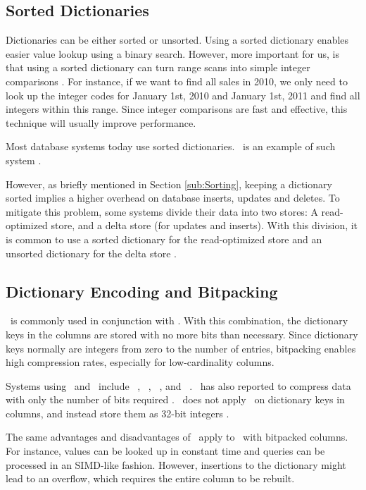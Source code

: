 \subsection{Sorted Dictionaries}
\label{sub:Sorted Dictionaries}
Dictionaries can be either sorted or unsorted. Using a sorted dictionary enables easier value lookup using a binary search. However, more important for us, is that using a sorted dictionary can turn range scans into simple integer comparisons \cite{Faust2015-ke}. For instance, if we want to find all sales in 2010, we only need to look up the integer codes for January 1st, 2010 and January 1st, 2011 and find all integers within this range. Since integer comparisons are fast and effective, this technique will usually improve performance. 

Most database systems today use sorted dictionaries. \saph~is an example of such system \cite{Farber2012-vh}.

However, as briefly mentioned in Section \ref{sub:Sorting}, keeping a dictionary sorted implies a higher overhead on database inserts, updates and deletes. To mitigate this problem, some systems divide their data into two stores: A read-optimized store, and a delta store (for updates and inserts). With this division, it is common to use a sorted dictionary for the read-optimized store and an unsorted dictionary for the delta store \cite{Plattner2014-fr}.

\subsection{Dictionary Encoding and Bitpacking}
\label{sub:Dictionary Encoding and Bitpacking}
\de~is commonly used in conjunction with \bp. With this combination, the dictionary keys in the columns are stored with no more bits than necessary. Since dictionary keys normally are integers from zero to the number of entries, bitpacking enables high compression rates, especially for low-cardinality columns.

Systems using \de~and \bp~include \ibm~\cite{Raman2013-em}, \blink~\cite{Barber2012-xt}, \sapnw~\cite{Willhalm2009-hu}, and \saph~\cite{Psaroudakis2014-ma}. \qlikview~has also reported to compress data with only the number of bits required \cite{Qlik2014-vd}. \mssql~does not apply \bp~on dictionary keys in columns, and instead store them as 32-bit integers \cite{Larson2013-mc}.

The same advantages and disadvantages of \bp~apply to \de~with bitpacked columns. For instance, values can be looked up in constant time and queries can be processed in an SIMD-like fashion. However, insertions to the dictionary might lead to an overflow, which requires the entire column to be rebuilt.

